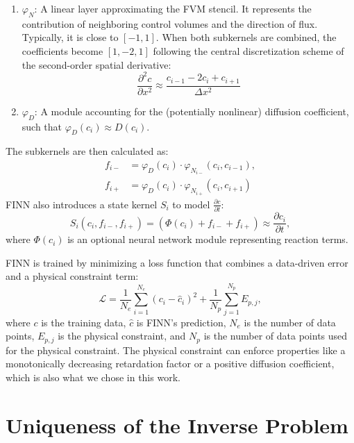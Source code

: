 \begin{enumerate}
    \item $\varphi_{N}$: A linear layer approximating the FVM stencil. It represents the contribution of neighboring control volumes and the direction of flux. Typically, it is close to $[-1, 1]$. When both subkernels are combined, the coefficients become $[1, -2, 1]$ following the central discretization scheme of the second-order spatial derivative:
    \begin{equation*}
    \frac{\partial^2 c}{\partial x^2} \approx \frac{c_{i-1} - 2c_i + c_{i+1}}{\Delta x^2}
    \end{equation*}

    \item $\varphi_{D}$: A module accounting for the (potentially nonlinear) diffusion coefficient, such that $\varphi_D(c_i) \approx D(c_i)$.
\end{enumerate}
The subkernels are then calculated as:
\begin{align*}
f_{i-} &= \varphi_D(c_i) \cdot \varphi_{N_{i-}}(c_i, c_{i-1}), \\
f_{i+} &= \varphi_D(c_i) \cdot \varphi_{N_{i+}}(c_i, c_{i+1})
\end{align*}
FINN also introduces a state kernel $S_i$ to model $\frac{\partial c}{\partial t}$:
\begin{equation*}
S_i(c_i, f_{i-}, f_{i+}) = (\varPhi(c_i) + f_{i-} + f_{i+}) \approx \frac{\partial c_i}{\partial t},
\end{equation*}
where $\varPhi(c_i)$ is an optional neural network module representing reaction terms.

FINN is trained by minimizing a loss function that combines a data-driven error and a physical constraint term:
\begin{equation*}
\mathcal{L} = \frac{1}{N_e} \sum_{i=1}^{N_e} (c_i - \hat{c}_i)^2 + \frac{1}{N_p} \sum_{j=1}^{N_p} E_{p,j},
\end{equation*}
where $c$ is the training data, $\hat{c}$ is FINN's prediction, $N_e$ is the number of data points, $E_{p,j}$ is the physical constraint, and $N_p$ is the number of data points used for the physical constraint. The physical constraint can enforce properties like a monotonically decreasing retardation factor or a positive diffusion coefficient, which is also what we chose in this work.



\section{Uniqueness of the Inverse Problem}
\label{sec:uniqueness}


